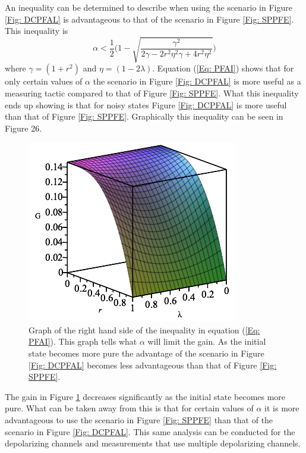 \documentclass[twocolumn]{article}
\begin{document}
An inequality can be determined to describe when using the scenario in Figure \ref{Fig: DCPFAL} is advantageous to that of the scenario in Figure \ref{Fig: SPPFE}. This inequality is
\begin{equation}\label{Eq: PFAI}
\alpha < \frac{1}{2}\Bigg(1-\sqrt{\frac{\gamma^2}{2\gamma-2r^2\eta^2\gamma+4r^2\eta^2}}\Bigg)
\end{equation}
where $\gamma=(1+r^2)$ and $\eta=(1-2\lambda)$. Equation (\ref{Eq: PFAI}) shows that for only certain values of $\alpha$ the scenario in Figure \ref{Fig: DCPFAL} is more useful as a measuring tactic compared to that of Figure \ref{Fig: SPPFE}. What this inequality ends up showing is that for noisy states Figure \ref{Fig: DCPFAL} is more useful than that of Figure \ref{Fig: SPPFE}. Graphically this inequality can be seen in Figure 26.
\begin{figure}[ht]
    \centering
    \includegraphics[scale=0.6]{Phase-Flip-Alpha-Inequality-Graph.png}
    \caption{\footnotesize{Graph of the right hand side of the inequality in equation (\ref{Eq: PFAI}). This graph tells what $\alpha$ will limit the gain. As the initial state becomes more pure the advantage of the scenario in Figure \ref{Fig: DCPFAL} becomes less advantageous than that of Figure \ref{Fig: SPPFE}.}}
    \label{Fig: PFAIG} 
\end{figure}
\par \noindent
The gain in Figure \ref{Fig: PFAIG} decreases significantly as the initial state becomes more pure. What can be taken away from this is that for certain values of $\alpha$ it is more advantageous to use the scenario in Figure \ref{Fig: SPPFE} than that of the scenario in Figure \ref{Fig: DCPFAL}. This same analysis can be conducted for the depolarizing channels and measurements that use multiple depolarizing channels.
\end{document}
